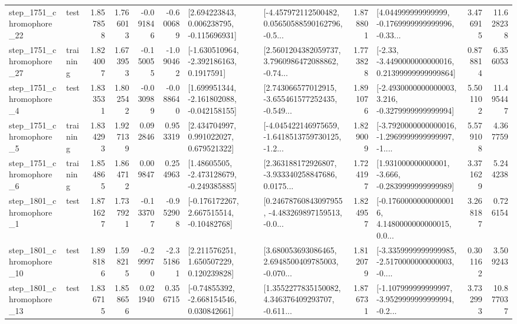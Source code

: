 \begin{tabular}{llrrrrllrlrr}
 step\_1751\_chromophore\_22 &      test &      1.857858 &    1.766013 &     -0.091846 & -0.600689 &    [2.694223843, 0.006238795, -0.115696931] &  [-4.457972112500482, 0.05650588590162796, -0.5... &       1.878801 &  [4.044999999999999, -0.1769999999999996, -0.33... &            3.476915 &         11.628238 \\
 step\_1751\_chromophore\_27 &  training &      1.824007 &    1.673953 &     -0.150055 & -1.090462 &     [-1.630510964, -2.392186163, 0.1917591] &  [2.5601204382059737, 3.7960986472088862, -0.74... &       1.773828 &  [-2.33, -3.4490000000000016, 0.21399999999999864] &            0.878814 &          6.356053 \\
  step\_1751\_chromophore\_4 &      test &      1.833531 &    1.802542 &     -0.030989 & -0.088640 &   [1.699951344, -2.161802088, -0.042158155] &  [2.743066577012915, -3.655461577252435, -0.549... &       1.891076 &  [-2.4930000000000003, 3.216, -0.3279999999999994] &            5.501102 &         11.495447 \\
  step\_1751\_chromophore\_5 &  training &      1.834293 &    1.927139 &      0.092846 &  0.953319 &     [2.434704997, 0.991022027, 0.679521322] &  [-4.045422146975659, -1.6418513759730125, -1.2... &       1.829009 &  [-3.7920000000000016, -1.2969999999999997, -1.... &            5.579108 &          4.367759 \\
  step\_1751\_chromophore\_6 &  training &      1.854865 &    1.864712 &      0.009847 &  0.254963 &    [1.48605505, -2.473128679, -0.249385885] &  [2.363188172926807, -3.933340258847686, 0.0175... &       1.724197 &   [1.931000000000001, -3.666, -0.2839999999999989] &            3.371629 &          5.244238 \\
  step\_1801\_chromophore\_1 &      test &      1.871627 &    1.737921 &     -0.133707 & -0.952908 &    [-0.176172267, 2.667515514, -0.10482768] &  [0.24678760843097955, -4.483269897159513, -0.0... &       1.824957 &  [-0.17600000000000016, 4.1480000000000015, 0.0... &            3.268187 &          0.726154 \\
 step\_1801\_chromophore\_10 &      test &      1.898186 &    1.598215 &     -0.299970 & -2.351861 &     [2.211576251, 1.650507229, 0.120239828] &  [3.680053693086465, 2.6948500409785003, -0.070... &       1.812079 &  [-3.3359999999999985, -2.5170000000000003, -0.... &            0.301162 &          3.509243 \\
 step\_1801\_chromophore\_13 &      test &      1.836715 &    1.858656 &      0.021940 &  0.356715 &    [-0.74855392, -2.668154546, 0.030842661] &  [1.3552277835150082, 4.346376409293707, -0.611... &       1.876731 &  [-1.107999999999997, -3.9529999999999994, -0.2... &            3.732993 &         10.877037 \\

\end{tabular}
